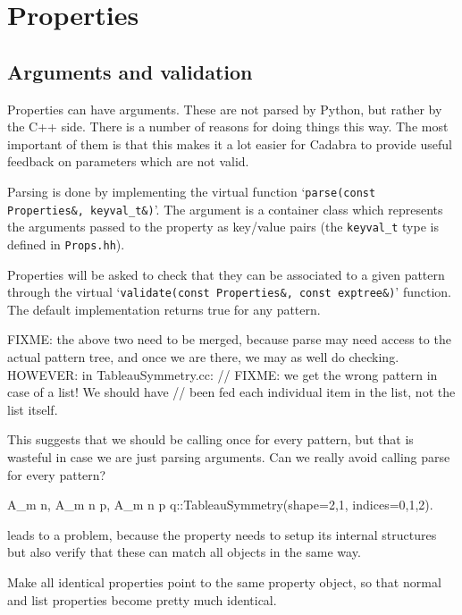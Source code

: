 
\section{Properties}

\subsection{Arguments and validation}

Properties can have arguments. These are not parsed by Python, but
rather by the C++ side. There is a number of reasons for doing things
this way. The most important of them is that this makes it a lot
easier for Cadabra to provide useful feedback on parameters which are
not valid.

Parsing is done by implementing the virtual function
`\verb|parse(const Properties&, keyval_t&)|'. The argument is a
container class which represents the arguments passed to the property
as key/value pairs (the \verb|keyval_t| type is defined in
\verb|Props.hh|).

Properties will be asked to check that they can be associated to a
given pattern through the virtual
`\verb|validate(const Properties&, const exptree&)|' function. The
default implementation returns true for any pattern.

FIXME: the above two need to be merged, because parse may need access
to the actual pattern tree, and once we are there, we may as well
do checking.
HOWEVER: in TableauSymmetry.cc:
			 // FIXME: we get the wrong pattern in case of a list! We should have
			 // been fed each individual item in the list, not the list itself.


This suggests that we should be calling once for every pattern, but 
that is wasteful in case we are just parsing arguments. Can we really
avoid calling parse for every pattern?

{A_{m n}, A_{m n p}, A_{m n p q}}::TableauSymmetry(shape={2,1}, indices={0,1,2}).

leads to a problem, because the property needs to setup its internal
structures but also verify that these can match all objects in the
same way. 


Make all identical properties point to the same property object, so
that normal and list properties become pretty much identical.

